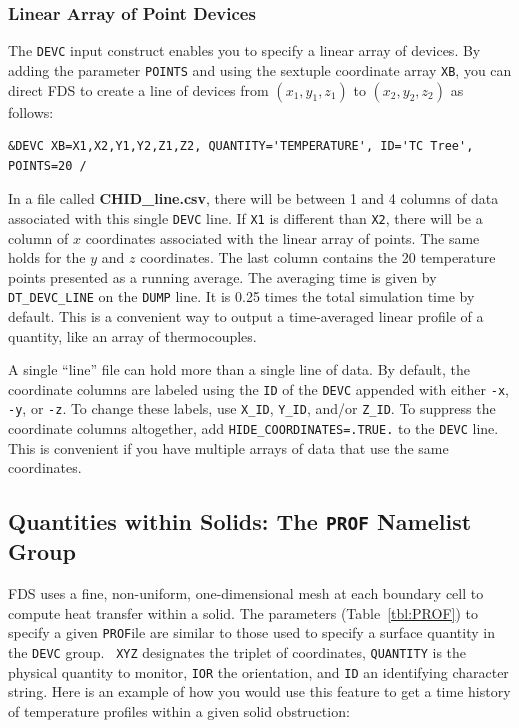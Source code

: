 \documentclass[11pt]{book}
\newcommand{\ct}{\tt\small}
\begin{document}
\subsubsection{Linear Array of Point Devices}
\label{info:line_file}

The {\ct DEVC} input construct enables you to specify a linear array of devices. By adding the parameter {\ct POINTS} and using the
sextuple coordinate array {\ct XB}, you can direct FDS to create a line of devices from $(x_1,y_1,z_1)$ to $(x_2,y_2,z_2)$ as follows:

\footnotesize
\begin{verbatim}
&DEVC XB=X1,X2,Y1,Y2,Z1,Z2, QUANTITY='TEMPERATURE', ID='TC Tree', POINTS=20 /
\end{verbatim}
\normalsize

\noindent
In a file called {\bf CHID\_line.csv}, there will be between 1 and 4 columns of data associated with this single {\ct DEVC} line. If {\ct X1} is
different than {\ct X2}, there will be a column of $x$ coordinates associated with the linear array of points. The same holds for the $y$ and
$z$ coordinates. The last column contains the 20 temperature points presented as a running average. The
averaging time is given by {\ct DT\_DEVC\_LINE} on the {\ct DUMP} line. It is 0.25 times the total simulation time by default. This is a convenient
way to output a time-averaged linear profile of a quantity, like an array of thermocouples.

A single ``line'' file can hold more than a single line of data. By default, the coordinate columns are labeled using the {\ct ID} of the {\ct DEVC} appended with
either {\ct -x}, {\ct -y}, or {\ct -z}. To change these labels, use {\ct X\_ID}, {\ct Y\_ID}, and/or {\ct Z\_ID}. To suppress the coordinate columns altogether, add
{\ct HIDE\_COORDINATES=.TRUE.} to the {\ct DEVC} line. This is convenient if you have multiple arrays of data that use the same coordinates.



\subsection{Quantities within Solids: The \texorpdfstring{{\tt PROF}}{PROF} Namelist Group}
\label{info:PROF}

FDS uses a fine, non-uniform, one-dimensional mesh at each boundary
cell to compute heat transfer within a solid. The parameters
(Table~\ref{tbl:PROF}) to specify a given {\ct PROF}ile are similar to
those used to specify a surface quantity in the {\ct DEVC} group. {\ct
XYZ} designates the triplet of coordinates, {\ct QUANTITY} is the
physical quantity to monitor, {\ct IOR} the orientation,
and {\ct ID} an identifying character string. Here is an example of
how you would use this feature to get a time history of temperature
profiles within a given solid obstruction:
\end{document}
